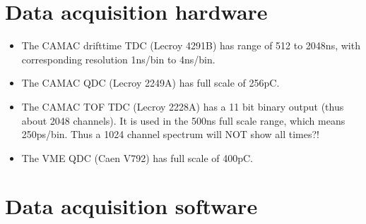 \documentclass[11pt]{report}
\begin{document}
\clearpage


\section{Data acquisition hardware}\label{section:daqhardware}

\begin{itemize}
\item The CAMAC drifttime TDC (Lecroy 4291B) has range of 512 to 2048ns, with corresponding resolution 1ns/bin to 4ns/bin.
\item The CAMAC QDC (Lecroy 2249A) has full scale of 256pC.
\item The CAMAC TOF TDC (Lecroy 2228A) has a 11 bit binary output (thus about 2048 channels).
It is used in the 500ns full scale range, which means 250ps/bin.
Thus a 1024 channel spectrum will NOT show all times?!
\item The VME QDC (Caen V792) has full scale of 400pC.

\end{itemize}

\section{Data acquisition software}\label{section:daqsoftware}
\end{document}
